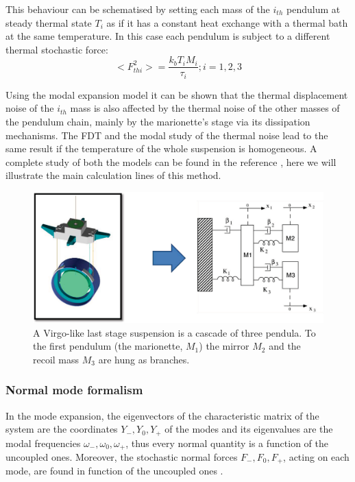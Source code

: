 This behaviour can be schematised by setting each mass of the $i_{th}$ pendulum at steady thermal state $T_i$ as if it has a constant heat exchange with a thermal bath at the same temperature.  
In this case each pendulum is subject to a different thermal stochastic force:
\begin{equation}
<F_{thi}^2>={\frac{k_b T_i M_i}{\tau_i}}; i=1,2,3
\label{stocforces}
\end{equation}

Using the modal expansion model it can be shown that the thermal displacement noise of the $i_{th}$ mass is also affected by the thermal noise of the other masses 
of the pendulum chain, mainly by the marionette's stage via its dissipation mechanisms.
The FDT and the modal study of the thermal noise lead to the same result if the temperature of the whole suspension is homogeneous. 
A complete study of both the models can be found in the reference \cite{PPP2009}, here we will illustrate the main calculation lines of this method.

\begin{figure}[h]
	\begin{center}
		 \includegraphics[width=12cm]{Sec_Suspensions/Figures/Branched.pdf}
			\caption{A Virgo-like last stage suspension is a cascade of three pendula.  To the first pendulum (the marionette, $M_1$) the mirror $M_2$ and the recoil mass $M_3$ are hung as branches.  }
\label{branched}
	\end{center}
\end{figure}

\FloatBarrier
\subsubsection{Normal mode formalism} 
In the mode expansion, the eigenvectors of the characteristic matrix of the system are the coordinates $Y_-,Y_0,Y_+$ of the modes and its eigenvalues are the modal frequencies $\omega_-,\omega_0,\omega_+$, thus every normal quantity is a function of the uncoupled ones. Moreover, the stochastic normal forces $F_-, F_0, F_+$, acting on each mode, are found in function of the uncoupled ones \cite{PPP2009}.

